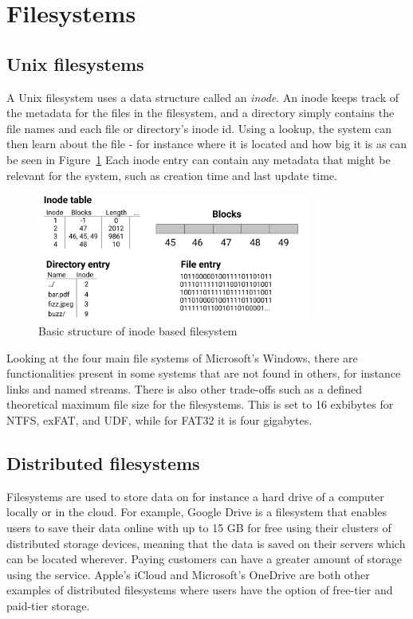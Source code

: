 \section{Filesystems}
\subsection{Unix filesystems}
A Unix filesystem uses a data structure called an \textit{inode}. An inode keeps track of the metadata for the files in the filesystem, and a directory simply contains the file names and each file or directory's inode id. Using a lookup, the system can then learn about the file - for instance where it is located and how big it is as can be seen in Figure~\ref{fig:inode_diag} %
Each inode entry can contain any metadata that might be relevant for the system, such as creation time and last update time.

\begin{figure}[!ht]
	\begin{center}
	  \includegraphics[width=0.8\textwidth]{figures/inode_diagram.png}
	\end{center}
	\caption{Basic structure of inode based filesystem}
	\label{fig:inode_diag}
\end{figure}

Looking at the four main file systems of Microsoft's Windows, there are functionalities present in some systems that are not found in others, for instance links and named streams. There is also other trade-offs such as a defined theoretical maximum file size\cite{mikbenFileSystemFunctionality} for the filesystems. This is set to 16 exbibytes for NTFS, exFAT, and UDF, while for FAT32 it is four gigabytes.


\subsection{Distributed filesystems}
Filesystems are used to store data on for instance a hard drive of a computer locally or in the cloud. For example, Google Drive is a filesystem that enables users to save their data online with up to 15 GB for free\cite{CloudStorageWork} using their clusters of distributed storage devices, meaning that the data is saved on their servers which can be located wherever\cite{DistributedStorageWhat}. Paying customers can have a greater amount of storage using the service. Apple's iCloud and Microsoft's OneDrive are both other examples of distributed filesystems where users have the option of free-tier and paid-tier storage.


